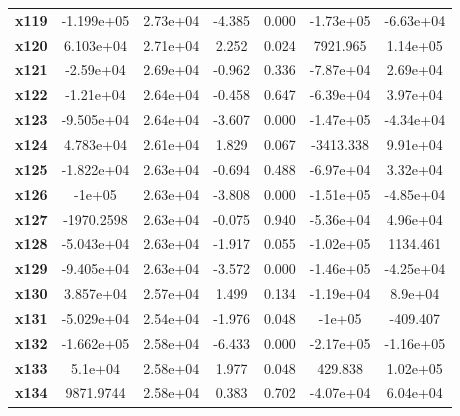 \documentclass{article}
\begin{document}
\begin{center}
{\begin{tabular}{lcccccc}
\textbf{x119}  &   -1.199e+05  &     2.73e+04     &    -4.385  &         0.000        &    -1.73e+05    &    -6.63e+04     \\
\textbf{x120}  &    6.103e+04  &     2.71e+04     &     2.252  &         0.024        &     7921.965    &     1.14e+05     \\
\textbf{x121}  &    -2.59e+04  &     2.69e+04     &    -0.962  &         0.336        &    -7.87e+04    &     2.69e+04     \\
\textbf{x122}  &    -1.21e+04  &     2.64e+04     &    -0.458  &         0.647        &    -6.39e+04    &     3.97e+04     \\
\textbf{x123}  &   -9.505e+04  &     2.64e+04     &    -3.607  &         0.000        &    -1.47e+05    &    -4.34e+04     \\
\textbf{x124}  &    4.783e+04  &     2.61e+04     &     1.829  &         0.067        &    -3413.338    &     9.91e+04     \\
\textbf{x125}  &   -1.822e+04  &     2.63e+04     &    -0.694  &         0.488        &    -6.97e+04    &     3.32e+04     \\
\textbf{x126}  &       -1e+05  &     2.63e+04     &    -3.808  &         0.000        &    -1.51e+05    &    -4.85e+04     \\
\textbf{x127}  &   -1970.2598  &     2.63e+04     &    -0.075  &         0.940        &    -5.36e+04    &     4.96e+04     \\
\textbf{x128}  &   -5.043e+04  &     2.63e+04     &    -1.917  &         0.055        &    -1.02e+05    &     1134.461     \\
\textbf{x129}  &   -9.405e+04  &     2.63e+04     &    -3.572  &         0.000        &    -1.46e+05    &    -4.25e+04     \\
\textbf{x130}  &    3.857e+04  &     2.57e+04     &     1.499  &         0.134        &    -1.19e+04    &      8.9e+04     \\
\textbf{x131}  &   -5.029e+04  &     2.54e+04     &    -1.976  &         0.048        &       -1e+05    &     -409.407     \\
\textbf{x132}  &   -1.662e+05  &     2.58e+04     &    -6.433  &         0.000        &    -2.17e+05    &    -1.16e+05     \\
\textbf{x133}  &      5.1e+04  &     2.58e+04     &     1.977  &         0.048        &      429.838    &     1.02e+05     \\
\textbf{x134}  &    9871.9744  &     2.58e+04     &     0.383  &         0.702        &    -4.07e+04    &     6.04e+04     \\

\end{tabular}}
\end{center}
\end{document}
